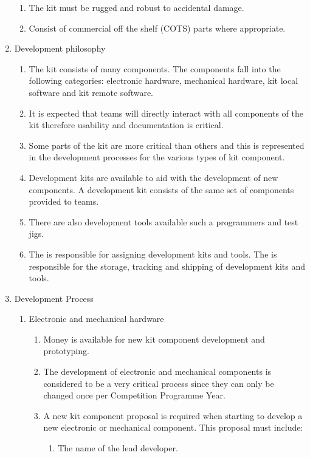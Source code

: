 \begin{draft}
\begin{enumerate}
\begin{enumerate}
    \item The kit must be rugged and robust to accidental damage.
    \item{Consist of commercial off the shelf (COTS) parts where appropriate.}
  \end{enumerate}
\item Development philosophy
  \begin{enumerate}
    \item The kit consists of many components. The components fall into the following categories: electronic hardware, mechanical hardware, kit local software and kit remote software.
    \item It is expected that teams will directly interact with all components of the kit therefore usability and documentation is critical.
    \item Some parts of the kit are more critical than others and this is represented in the development processes for the various types of kit component.
    \item Development kits are available to aid with the development of new components. A development kit consists of the same set of components provided to teams.
    \item There are also development tools available such a programmers and test jigs.
    \item The  is responsible for assigning development kits and tools. The  is responsible for the storage, tracking and shipping of development kits and tools.
  \end{enumerate}
\item Development Process
  \begin{enumerate}
    \item Electronic and mechanical hardware
      \begin{enumerate}
        \item Money is available for new kit component development and prototyping.
        \item The development of electronic and mechanical components is considered to be a very critical process since they can only be changed once per Competition Programme Year.
        \item A new kit component proposal is required when starting to develop a new electronic or mechanical component. This proposal must include:
          \begin{enumerate}
            \item The name of the lead developer.

\end{enumerate}
\end{enumerate}
\end{enumerate}
\end{enumerate}
\end{draft}
